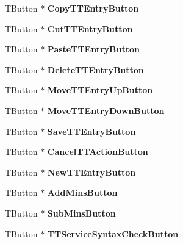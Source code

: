 \begin{DoxyCompactItemize}
T\+Button $\ast$ {\bfseries Copy\+T\+T\+Entry\+Button}
\item 
\mbox{\label{class_t_interface_a44e28354c7d9f5a4caba63bcd1a01117}} 
T\+Button $\ast$ {\bfseries Cut\+T\+T\+Entry\+Button}
\item 
\mbox{\label{class_t_interface_a29a1d5ee2fc29a199da6df9a2b2656b1}} 
T\+Button $\ast$ {\bfseries Paste\+T\+T\+Entry\+Button}
\item 
\mbox{\label{class_t_interface_a5be6e5458bd60b7b368aced20de998b2}} 
T\+Button $\ast$ {\bfseries Delete\+T\+T\+Entry\+Button}
\item 
\mbox{\label{class_t_interface_a3574fc45b2c1f419dcf036d879f64787}} 
T\+Button $\ast$ {\bfseries Move\+T\+T\+Entry\+Up\+Button}
\item 
\mbox{\label{class_t_interface_a87ed9d91fe09c132cfd49387f910adb8}} 
T\+Button $\ast$ {\bfseries Move\+T\+T\+Entry\+Down\+Button}
\item 
\mbox{\label{class_t_interface_af45a2819bd790f9f2027428d04186cbe}} 
T\+Button $\ast$ {\bfseries Save\+T\+T\+Entry\+Button}
\item 
\mbox{\label{class_t_interface_aed0912cd6d553fdf11c8034286dae1eb}} 
T\+Button $\ast$ {\bfseries Cancel\+T\+T\+Action\+Button}
\item 
\mbox{\label{class_t_interface_ac8b3c13ee3a33f431d69323518916a1a}} 
T\+Button $\ast$ {\bfseries New\+T\+T\+Entry\+Button}
\item 
\mbox{\label{class_t_interface_a23b4a45fb20db0d33df44d3b3596a051}} 
T\+Button $\ast$ {\bfseries Add\+Mins\+Button}
\item 
\mbox{\label{class_t_interface_a3a71dce954035bb65a2114436f4786cb}} 
T\+Button $\ast$ {\bfseries Sub\+Mins\+Button}
\item 
\mbox{\label{class_t_interface_aad20be770ca7c2f9283bfcae270e1df4}} 
T\+Button $\ast$ {\bfseries T\+T\+Service\+Syntax\+Check\+Button}

\end{DoxyCompactItemize}
